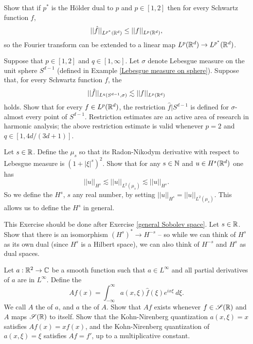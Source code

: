 \begin{exercise}
Show that if $p^*$ is the H\"older dual to $p$ and $p \in [1, 2]$ then for every Schwartz function $f$,
$$||\hat f||_{L^{p^*}(\mathbb{R}^d)} \leq ||f||_{L^p(\mathbb{R}^d)},$$
so the Fourier transform can be extended to a linear map $L^p(\mathbb{R}^d) \to L^{p^*}(\mathbb{R}^d)$.
\end{exercise}

\begin{exercise}
Suppose that $p \in [1, 2]$ and $q \in [1, \infty]$.
Let $\sigma$ denote Lebesgue measure on the unit sphere $S^{d-1}$ (defined in Example \ref{Lebesgue measure on sphere}).
Suppose that, for every Schwartz function $f$, the 
$$||\hat f||_{L^q(S^{d-1}, \sigma)} \lesssim ||f||_{L^p(\mathbb{R}^d)}$$
holds.
Show that for every $f \in L^p(\mathbb{R}^d)$, the restriction $\hat f|S^{d-1}$ is defined for $\sigma$-almost every point of $S^{d-1}$.
Restriction estimates are an active area of research in harmonic analysis; the above restriction estimate is valid whenever $p = 2$ and $q \in [1, 4d/(3d+1)]$.
\end{exercise}

\begin{exercise}
\label{general Sobolev space}
Let $s \in \mathbb{R}$. Define the  $\mu_s$ so that its Radon-Nikodym derivative with respect to Lebesgue measure is $(1 + |\xi|^s)^2$.
Show that for any $s \in \mathbb{N}$ and $u \in H^s(\mathbb{R}^d)$ one has
$$||u||_{H^s} \lesssim ||u||_{L^2(\mu_s)} \lesssim ||u||_{H^s}.$$
So we define the  $H^s$, $s$ any real number, by setting $||u||_{H^s} = ||u||_{L^2(\mu_s)}$.
This allows us to define the  $H^s$ in general.
\end{exercise}

\begin{exercise}
This Exercise should be done after Exercise \ref{general Sobolev space}.
Let $s \in \mathbb{R}$. Show that there is an isomorphism $(H^s)^* \to H^{-s}$ -- so while we can think of $H^s$ as its own dual (since $H^s$ is a Hilbert space), we can also think of $H^{-s}$ and $H^s$ as dual spaces.
\end{exercise}

\begin{exercise}
Let $a: \mathbb{R}^2 \to \mathbb{C}$ be a smooth function such that $a \in L^\infty$ and all partial derivatives of $a$ are in $L^\infty$.
Define the 
$$Af(x) = \int_{-\infty}^\infty a(x, \xi) \hat f(\xi) e^{ix\xi}~d\xi.$$
We call $A$ the  of $a$, and $a$ the  of $A$.
Show that $Af$ exists whenever $f \in \mathscr S(\mathbb{R})$ and $A$ maps $\mathscr S(\mathbb{R})$ to itself.
Show that the Kohn-Nirenberg quantization $a(x, \xi) = x$ satisfies $Af(x) = xf(x)$, and the Kohn-Nirenberg quantization of $a(x, \xi) = \xi$ satisfies $Af = f'$, up to a multiplicative constant.
\end{exercise}

